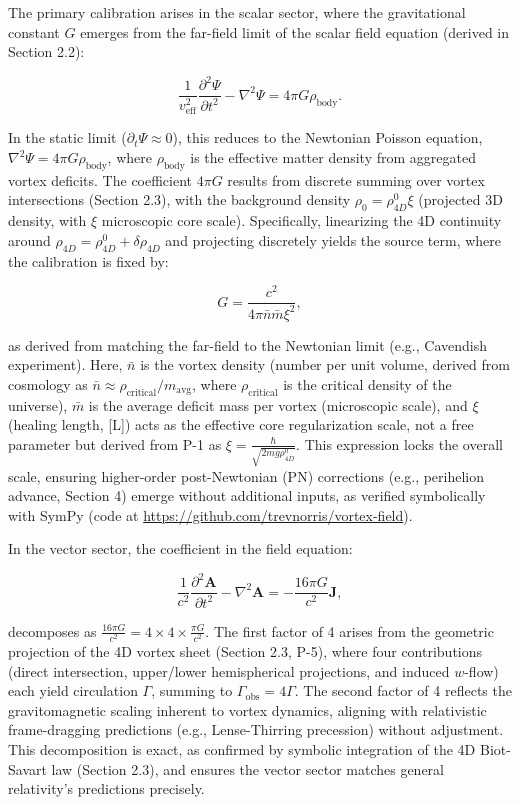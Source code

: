 The primary calibration arises in the scalar sector, where the gravitational constant $G$ emerges from the far-field limit of the scalar field equation (derived in Section 2.2):

\[
\frac{1}{v_{\text{eff}}^2} \frac{\partial^2 \Psi}{\partial t^2} - \nabla^2 \Psi = 4\pi G \rho_{\text{body}}.
\]

In the static limit ($\partial_t \Psi \approx 0$), this reduces to the Newtonian Poisson equation, $\nabla^2 \Psi = 4\pi G \rho_{\text{body}}$, where $\rho_{\text{body}}$ is the effective matter density from aggregated vortex deficits. The coefficient $4\pi G$ results from discrete summing over vortex intersections (Section 2.3), with the background density $\rho_0 = \rho_{4D}^0 \xi$ (projected 3D density, with $\xi$ microscopic core scale). Specifically, linearizing the 4D continuity around $\rho_{4D} = \rho_{4D}^0 + \delta \rho_{4D}$ and projecting discretely yields the source term, where the calibration is fixed by:

\[
G = \frac{c^2}{4\pi \bar{n} \bar{m} \xi^2},
\]

as derived from matching the far-field to the Newtonian limit (e.g., Cavendish experiment). Here, $\bar{n}$ is the vortex density (number per unit volume, derived from cosmology as $\bar{n} \approx \rho_{\text{critical}} / m_{\text{avg}}$, where $\rho_{\text{critical}}$ is the critical density of the universe), $\bar{m}$ is the average deficit mass per vortex (microscopic scale), and $\xi$ (healing length, [L]) acts as the effective core regularization scale, not a free parameter but derived from P-1 as $\xi = \frac{\hbar}{\sqrt{2 m g \rho_{4D}^0}}$. This expression locks the overall scale, ensuring higher-order post-Newtonian (PN) corrections (e.g., perihelion advance, Section 4) emerge without additional inputs, as verified symbolically with SymPy (code at \url{https://github.com/trevnorris/vortex-field}).

In the vector sector, the coefficient in the field equation:

\[
\frac{1}{c^2} \frac{\partial^2 \mathbf{A}}{\partial t^2} - \nabla^2 \mathbf{A} = -\frac{16\pi G}{c^2} \mathbf{J},
\]

decomposes as $\frac{16\pi G}{c^2} = 4 \times 4 \times \frac{\pi G}{c^2}$. The first factor of 4 arises from the geometric projection of the 4D vortex sheet (Section 2.3, P-5), where four contributions (direct intersection, upper/lower hemispherical projections, and induced $w$-flow) each yield circulation $\Gamma$, summing to $\Gamma_{\text{obs}} = 4\Gamma$. The second factor of 4 reflects the gravitomagnetic scaling inherent to vortex dynamics, aligning with relativistic frame-dragging predictions (e.g., Lense-Thirring precession) without adjustment. This decomposition is exact, as confirmed by symbolic integration of the 4D Biot-Savart law (Section 2.3), and ensures the vector sector matches general relativity's predictions precisely.


